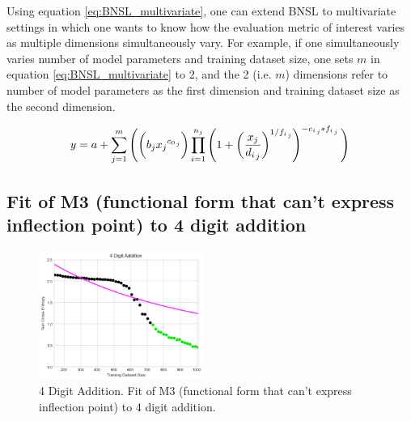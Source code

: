 \documentclass{article} %
\begin{document}
Using equation \ref{eq:BNSL_multivariate}, one can extend BNSL to multivariate settings in which one wants to know how the evaluation metric of interest varies as multiple dimensions simultaneously vary. For example, if one simultaneously varies number of model parameters and training dataset size, one sets $m$ in equation \ref{eq:BNSL_multivariate} to 2, and the 2 (i.e. $m$) dimensions refer to number of model parameters as the first dimension and training dataset size as the second dimension.

\begin{equation}
\vspace{-0.05in}
y =  a + \sum_{j=1}^{m}\Bigg(\bigg(b_j{x_j}^{{{c_0}_{}}_j}\bigg) \prod_{i=1}^{n_j} \left(1 + \left(\frac{x_j}{{{d_i}_{}}_j}\right)^{{1/{{f_i}_{}}}_j}\right)^{-{{c_i}_{}}_j * {{f_i}_{}}_j}\Bigg)
\label{eq:BNSL_multivariate}
\end{equation}

\fi

\iffalse

\subsection{Fit of M3 (functional form that can't express inflection point) to 4 digit addition}
\FloatBarrier
\label{section:M3_addition_failure}


\FloatBarrier

\begin{figure}[htbp]
    \centering
\includegraphics[width=0.48\textwidth]{figures/arithmetic/4_digit_addition__dataset_size__very_first_version__M3.png}

    \caption{
    4 Digit Addition. Fit of M3 (functional form that can't express inflection point) to 4 digit addition.
    }
    \label{fig:M3_addition_failure}
\end{figure}
\end{document}
